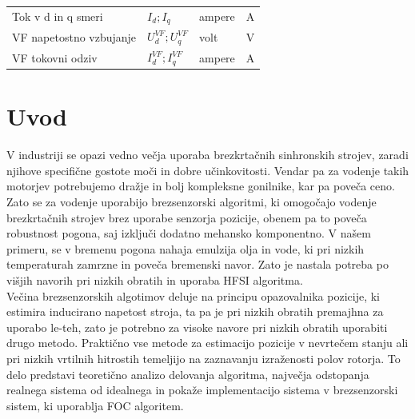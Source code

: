 \documentclass[a4paper,twoside,openright,12pt,slovene]{book}
\begin{document}
\begin{center}
\begin{tabular}{*{4}{l}}
        Tok v d in q smeri                                         & $I_{d}; I_{q}$                         & ampere               & A                      \\
        VF napetostno vzbujanje                                    & $U^{VF}_{d}; U^{VF}_{q}$               & volt                 & V                      \\
        VF tokovni odziv                                           & $I^{VF}_{d}; I^{VF}_{q}$               & ampere               & A                      \\
    \end{tabular}
\end{center}

\mainmatter

\chapter{Uvod} \label{uvod}

V industriji se opazi vedno večja uporaba brezkrtačnih sinhronskih strojev, zaradi njihove specifične gostote moči in dobre učinkovitosti. Vendar pa za vodenje takih motorjev potrebujemo dražje in
bolj kompleksne gonilnike, kar pa poveča ceno. Zato se za vodenje uporabijo brezsenzorski algoritmi, ki omogočajo vodenje brezkrtačnih strojev brez uporabe senzorja pozicije, obenem pa to poveča
robustnost pogona, saj izključi dodatno mehansko komponentno. V našem primeru, se v bremenu pogona nahaja emulzija olja in vode, ki pri nizkih temperaturah zamrzne in poveča bremenski navor. Zato je
nastala potreba po višjih navorih pri nizkih obratih in uporaba HFSI algoritma. 
\\
Večina brezsenzorskih algotimov deluje na principu opazovalnika pozicije, ki estimira inducirano napetost stroja, ta pa je pri nizkih obratih
premajhna za uporabo le-teh, zato je potrebno za visoke navore pri nizkih obratih uporabiti drugo metodo. Praktično vse metode za estimacijo pozicije v nevrtečem stanju ali pri nizkih vrtilnih hitrostih
temeljijo na zaznavanju izraženosti polov rotorja. To delo predstavi teoretično analizo delovanja algoritma, največja odstopanja realnega sistema od idealnega in pokaže implementacijo sistema v
brezsenzorski sistem, ki uporablja FOC algoritem.



\end{document}
